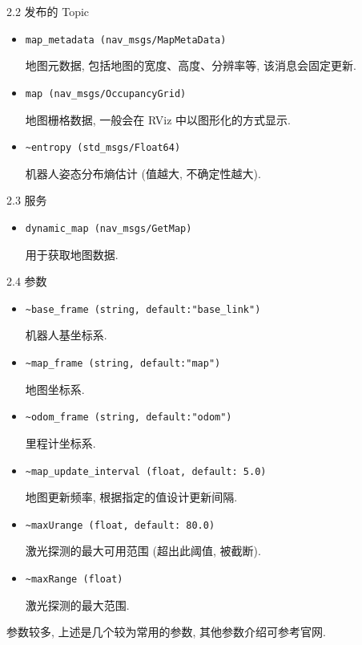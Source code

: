 \documentclass[openany, fontset=windowsold]{ctexbook}
\theoremstyle{kaiti}
\theoremstyle{normal}
\begin{document}
2.2 发布的 Topic

\begin{itemize}
  \item \verb|map_metadata (nav_msgs/MapMetaData)|

  地图元数据, 包括地图的宽度、高度、分辨率等, 该消息会固定更新.

  \item \verb|map (nav_msgs/OccupancyGrid)|

  地图栅格数据, 一般会在 RViz 中以图形化的方式显示.

  \item \verb|~entropy (std_msgs/Float64)|

  机器人姿态分布熵估计 (值越大, 不确定性越大).
\end{itemize}

2.3 服务

\begin{itemize}
  \item \verb|dynamic_map (nav_msgs/GetMap)|

  用于获取地图数据.
\end{itemize}

2.4 参数

\begin{itemize}
  \item \verb|~base_frame (string, default:"base_link")|

  机器人基坐标系.

  \item \verb|~map_frame (string, default:"map")|

  地图坐标系.

  \item \verb|~odom_frame (string, default:"odom")|

  里程计坐标系.

  \item \verb|~map_update_interval (float, default: 5.0)|

  地图更新频率, 根据指定的值设计更新间隔.

  \item \verb|~maxUrange (float, default: 80.0)|

  激光探测的最大可用范围 (超出此阈值, 被截断).

  \item \verb|~maxRange (float)|

  激光探测的最大范围.
\end{itemize}

参数较多, 上述是几个较为常用的参数, 其他参数介绍可参考官网.
\end{document}
